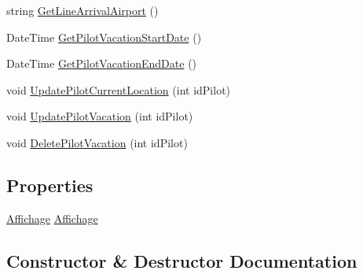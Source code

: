 \begin{DoxyCompactItemize}
\item 
string \hyperlink{class_application__de__planification__de__vols__a_xC3_xA9riens_1_1_d_b_connexion_a59e8c9cdf2b3043c9cc4355419b5bc79}{Get\+Line\+Arrival\+Airport} ()
\item 
Date\+Time \hyperlink{class_application__de__planification__de__vols__a_xC3_xA9riens_1_1_d_b_connexion_af1fa07f5886addf269c81006ac2aea20}{Get\+Pilot\+Vacation\+Start\+Date} ()
\item 
Date\+Time \hyperlink{class_application__de__planification__de__vols__a_xC3_xA9riens_1_1_d_b_connexion_a2f261287db878f31b7671c16e396be91}{Get\+Pilot\+Vacation\+End\+Date} ()
\item 
void \hyperlink{class_application__de__planification__de__vols__a_xC3_xA9riens_1_1_d_b_connexion_a1f3c10dfb0761cc5faf712da404d914d}{Update\+Pilot\+Current\+Location} (int id\+Pilot)
\item 
void \hyperlink{class_application__de__planification__de__vols__a_xC3_xA9riens_1_1_d_b_connexion_a7ffa071048ef30396e6eeb5ee4435a9c}{Update\+Pilot\+Vacation} (int id\+Pilot)
\item 
void \hyperlink{class_application__de__planification__de__vols__a_xC3_xA9riens_1_1_d_b_connexion_a9e939a53425fe692b729959290f3a815}{Delete\+Pilot\+Vacation} (int id\+Pilot)
\end{DoxyCompactItemize}
\subsection*{Properties}
\begin{DoxyCompactItemize}
\item 
\hyperlink{class_application__de__planification__de__vols__a_xC3_xA9riens_1_1_affichage}{Affichage} \hyperlink{class_application__de__planification__de__vols__a_xC3_xA9riens_1_1_d_b_connexion_a9d40a66d3bad725d77c5affafbc73d98}{Affichage}
\end{DoxyCompactItemize}


\subsection{Constructor \& Destructor Documentation}
\mbox{\label{class_application__de__planification__de__vols__a_xC3_xA9riens_1_1_d_b_connexion_a9b5698ceb5adf9b44a745d830bf2ecaf}} 
